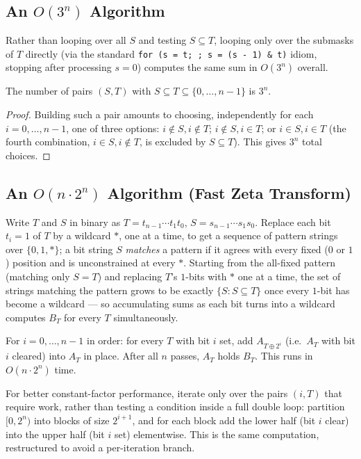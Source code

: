 \documentclass[11pt]{article}
\begin{document}
\subsection{An \texorpdfstring{$O(3^n)$}{O(3\^{}n)} Algorithm}
Rather than looping over all $S$ and testing $S \subseteq T$, looping
only over the submasks of $T$ directly (via the standard
\texttt{for (s = t; ; s = (s - 1) \& t)} idiom, stopping after
processing $s=0$) computes the same sum in $O(3^n)$ overall.

\begin{theorembox}
The number of pairs $(S,T)$ with $S \subseteq T \subseteq
\{0,\ldots,n-1\}$ is $3^n$.
\end{theorembox}
\begin{proof}
Building such a pair amounts to choosing, independently for each
$i=0,\ldots,n-1$, one of three options: $i \notin S, i \notin T$;
$i \notin S, i \in T$; or $i \in S, i \in T$ (the fourth combination,
$i \in S, i \notin T$, is excluded by $S \subseteq T$). This gives $3^n$
total choices.
\end{proof}

\subsection{An \texorpdfstring{$O(n\cdot 2^n)$}{O(n*2\^{}n)} Algorithm (Fast Zeta Transform)}
Write $T$ and $S$ in binary as $T=t_{n-1}\cdots t_1t_0$,
$S=s_{n-1}\cdots s_1s_0$. Replace each bit $t_i=1$ of $T$ by a wildcard
$*$, one at a time, to get a sequence of pattern strings over
$\{0,1,*\}$; a bit string $S$ \emph{matches} a pattern if it agrees with
every fixed ($0$ or $1$) position and is unconstrained at every $*$.
Starting from the all-fixed pattern (matching only $S=T$) and replacing
$T$'s $1$-bits with $*$ one at a time, the set of strings matching the
pattern grows to be exactly $\{S : S \subseteq T\}$ once every $1$-bit
has become a wildcard --- so accumulating sums as each bit turns into a
wildcard computes $B_T$ for every $T$ simultaneously.

\begin{theorembox}
For $i=0,\ldots,n-1$ in order: for every $T$ with bit $i$ set, add
$A_{T \oplus 2^i}$ (i.e.\ $A_T$ with bit $i$ cleared) into $A_T$
in place. After all $n$ passes, $A_T$ holds $B_T$. This runs in
$O(n\cdot 2^n)$ time.
\end{theorembox}

\begin{notebox}
For better constant-factor performance, iterate only over the pairs
$(i,T)$ that require work, rather than testing a condition inside a full
double loop: partition $[0,2^n)$ into blocks of size $2^{i+1}$, and for
each block add the lower half (bit $i$ clear) into the upper half (bit
$i$ set) elementwise. This is the same computation, restructured to
avoid a per-iteration branch.
\end{notebox}
\end{document}
